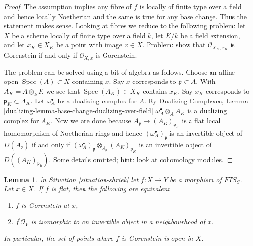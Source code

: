 \documentclass{stacks-project}
\theoremstyle{plain}
\newtheorem{lemma}[subsection]{Lemma}
\theoremstyle{definition}
\theoremstyle{remark}
\numberwithin{equation}{subsection}
\def\Spec{\mathop{\mathrm{Spec}}}
\begin{document}
\begin{proof}
The assumption implies any fibre of $f$ is locally of finite type
over a field and hence locally Noetherian and the same is true for
any base change. Thus the statement makes sense. Looking at
fibres we reduce to the following problem: let $X$ be a scheme
locally of finite type over a field $k$,
let $K/k$ be a field extension, and
let $x_K \in X_K$ be a point with image $x \in X$.
Problem: show that $\mathcal{O}_{X_K, x_K}$ is Gorenstein if and only if
$\mathcal{O}_{X, x}$ is Gorenstein.

\medskip\noindent
The problem can be solved using a bit of algebra as follows.
Choose an affine open $\Spec(A) \subset X$ containing $x$.
Say $x$ corresponds to $\mathfrak p \subset A$.
With $A_K = A \otimes_k K$ we see that $\Spec(A_K) \subset X_K$
contains $x_K$. Say $x_K$ corresponds to $\mathfrak p_K \subset A_K$.
Let $\omega_A^\bullet$ be a dualizing complex for $A$.
By Dualizing Complexes, Lemma
\ref{dualizing-lemma-base-change-dualizing-over-field}
$\omega_A^\bullet \otimes_A A_K$ is a dualizing complex for $A_K$.
Now we are done because
$A_\mathfrak p \to (A_K)_{\mathfrak p_K}$ is a flat local
homomorphism of Noetherian rings and hence
$(\omega_A^\bullet)_\mathfrak p$ is an invertible object
of $D(A_\mathfrak p)$ if and only if
$(\omega_A^\bullet)_\mathfrak p \otimes_{A_\mathfrak p} (A_K)_{\mathfrak p_K}$
is an invertible object of $D((A_K)_{\mathfrak p_K})$.
Some details omitted; hint: look at cohomology modules.
\end{proof}

\begin{lemma}
\label{lemma-affine-flat-Noetherian-gorenstein}
In Situation \ref{situation-shriek} let $f : X \to Y$ be a morphism
of $\textit{FTS}_S$. Let $x \in X$. If $f$ is flat, then
the following are equivalent
\begin{enumerate}
\item $f$ is Gorenstein at $x$,
\item $f^!\mathcal{O}_Y$ is isomorphic to an invertible object
in a neighbourhood of $x$.
\end{enumerate}
In particular, the set of points where $f$ is Gorenstein is
open in $X$.
\end{lemma}
\end{document}
